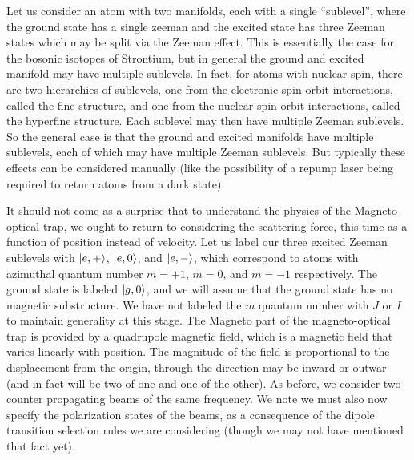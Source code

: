 \documentclass[../../main.tex]{subfiles}
\begin{document}
Let us consider an atom with two manifolds, each with a single ``sublevel'', where the ground state has a single zeeman and the excited state has three Zeeman states which may be split via the Zeeman effect. This is essentially the case for the bosonic isotopes of Strontium, but in general the ground and excited manifold may have multiple sublevels. In fact, for atoms with nuclear spin, there are two hierarchies of sublevels, one from the electronic spin-orbit interactions, called the fine structure, and one from the nuclear spin-orbit interactions, called the hyperfine structure. Each sublevel may then have multiple Zeeman sublevels. So the general case is that the ground and excited manifolds have multiple sublevels, each of which may have multiple Zeeman sublevels. But typically these effects can be considered manually (like the possibility of a repump laser being required to return atoms from a dark state).

It should not come as a surprise that to understand the physics of the Magneto-optical trap, we ought to return to considering the scattering force, this time as a function of position instead of velocity. Let us label our three excited Zeeman sublevels with $\ket{e,+}$, $\ket{e,0}$, and $\ket{e,-}$, which correspond to atoms with azimuthal quantum number $m=+1$, $m=0$, and $m=-1$ respectively. The ground state is labeled $\ket{g,0}$, and we will assume that the ground state has no magnetic substructure. We have not labeled the $m$ quantum number with $J$ or $I$ to maintain generality at this stage. The Magneto part of the magneto-optical trap is provided by a quadrupole magnetic field, which is a magnetic field that varies linearly with position. The magnitude of the field is proportional to the displacement from the origin, through the direction may be inward or outwar (and in fact will be two of one and one of the other). As before, we consider two counter propagating beams of the same frequency. We note we must also now specify the polarization states of the beams, as a consequence of the dipole transition selection rules we are considering (though we may not have mentioned that fact yet). 
\end{document}
